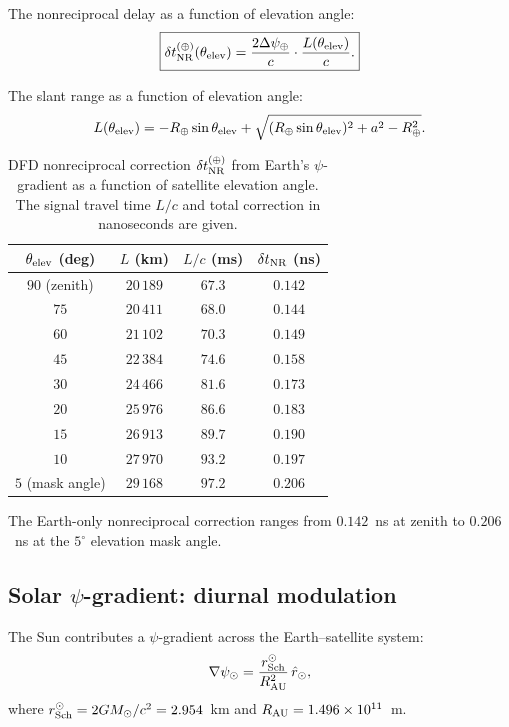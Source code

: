 \documentclass[aps,prl,twocolumn,superscriptaddress,showpacs]{revtex4-2}
\newcommand{\Msun}{M_\odot}
\newcommand{\Rearth}{R_\oplus}
\newcommand{\rSch}{r_{\rm Sch}}
\begin{document}
The nonreciprocal delay as a function of elevation angle:
\begin{equation}
\boxed{
\delta t_{\rm NR}^{(\oplus)}(\theta_{\rm elev})
= \frac{2\Delta\psi_\oplus}{c}\cdot\frac{L(\theta_{\rm elev})}{c}.
}
\label{eq:NR_earth}
\end{equation}

The slant range as a function of elevation angle:
\begin{equation}
L(\theta_{\rm elev}) = -\Rearth\sin\theta_{\rm elev}
+ \sqrt{(\Rearth\sin\theta_{\rm elev})^2 + a^2 - \Rearth^2}.
\end{equation}

\begin{table}[t]
\caption{DFD nonreciprocal correction $\delta t_{\rm NR}^{(\oplus)}$
from Earth's $\psi$-gradient as a function of satellite elevation
angle.  The signal travel time $L/c$ and total correction in
nanoseconds are given.}
\label{tab:elevation}
\begin{ruledtabular}
\begin{tabular}{cccc}
$\theta_{\rm elev}$ (deg) & $L$ (km) & $L/c$ (ms) & $\delta t_{\rm NR}$ (ns) \\
\hline
$90$ (zenith) & $20\,189$ & $67.3$ & $0.142$ \\
$75$ & $20\,411$ & $68.0$ & $0.144$ \\
$60$ & $21\,102$ & $70.3$ & $0.149$ \\
$45$ & $22\,384$ & $74.6$ & $0.158$ \\
$30$ & $24\,466$ & $81.6$ & $0.173$ \\
$20$ & $25\,976$ & $86.6$ & $0.183$ \\
$15$ & $26\,913$ & $89.7$ & $0.190$ \\
$10$ & $27\,970$ & $93.2$ & $0.197$ \\
$5$ (mask angle) & $29\,168$ & $97.2$ & $0.206$ \\
\end{tabular}
\end{ruledtabular}
\end{table}

The Earth-only nonreciprocal correction ranges from $0.142$~ns
at zenith to $0.206$~ns at the $5^\circ$ elevation mask angle.

\subsection{Solar $\psi$-gradient: diurnal modulation}

The Sun contributes a $\psi$-gradient across the Earth--satellite
system:
\begin{equation}
\nabla\psi_\odot = \frac{\rSch^\odot}{R_{\rm AU}^2}\,\hat{r}_\odot,
\end{equation}
where $\rSch^\odot = 2G\Msun/c^2 = 2.954$~km and
$R_{\rm AU} = 1.496\times 10^{11}$~m.
\end{document}
